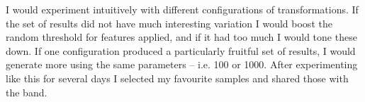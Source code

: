 I would experiment intuitively with different configurations of transformations. 
If the set of results did not have much interesting variation I would boost the random threshold for features applied, and if it had too much I would tone these down. 
If one configuration produced a particularly fruitful set of results, I would generate more using the same parameters -- i.e. 100 or 1000. 
After experimenting like this for several days I selected my favourite samples and shared those with the band.

\begin{figure}[!htbp]
    \hfill
    \hfill
    \hfill

\end{figure}
